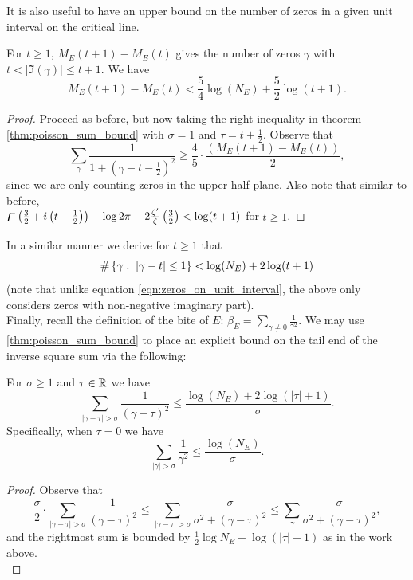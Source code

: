 It is also useful to have an upper bound on the number of zeros in a given unit interval on the critical line.
\begin{corollary}[GRH]\label{cor:zeros_on_unit_interval}
For $t\ge1$, $M_E(t+1)-M_E(t)$ gives the number of zeros $\gamma$ with $t < |\Im(\gamma)| \le t+1$. We have
\begin{equation}\label{eqn:zeros_on_unit_interval}
M_E(t+1)-M_E(t) < \frac{5}{4}\log(N_E) + \frac{5}{2}\log(t+1).
\end{equation}
\end{corollary}
\begin{proof}
Proceed as before, but now taking the right inequality in theorem \ref{thm:poisson_sum_bound} with $\sigma = 1$ and $\tau=t+\frac{1}{2}$. Observe that
\begin{equation*}
\sum_{\gamma}\frac{1}{1+\left(\gamma-t-\frac{1}{2}\right)^2} \ge \frac{4}{5}\cdot\frac{\left(M_E(t+1)-M_E(t)\right)}{2},
\end{equation*}
since we are only counting zeros in the upper half plane. Also note that similar to before,\\
$\digamma\left(\frac{3}{2}+i\left(t+\frac{1}{2}\right)\right) - \log 2\pi - 2\frac{\zeta^{\prime}}{\zeta}\left(\frac{3}{2}\right) < \log(t+1)$ for $t \ge 1$.
\end{proof}
In a similar manner we derive for $t \ge 1$ that
\begin{equation}\label{eqn:zeros_in_unit_ball}
\#\left\{\gamma:\;|\gamma-t|\le 1\right\} < \log(N_E) + 2\log(t+1)
\end{equation}
(note that unlike equation \ref{eqn:zeros_on_unit_interval}, the above only considers zeros with non-negative imaginary part). \\

Finally, recall the definition of the bite of $E$: $\beta_E = \sum_{\gamma \ne 0} \frac{1}{\gamma^2}$. We may use \ref{thm:poisson_sum_bound} to place an explicit bound on the tail end of the inverse square sum via the following:
\begin{corollary}[GRH]\label{cor:sum_tail_bound}
For $\sigma \ge 1$ and $\tau \in \mathbb{R}$ we have
\begin{equation}
\sum_{|\gamma-\tau|>\sigma} \frac{1}{(\gamma-\tau)^2} \le \frac{\log(N_E) + 2\log(|\tau|+1)}{\sigma}.
\end{equation}
Specifically, when $\tau=0$ we have
\begin{equation}
\sum_{|\gamma|>\sigma} \frac{1}{\gamma^2} \le \frac{\log(N_E)}{\sigma}.
\end{equation}
\end{corollary}
\begin{proof}
Observe that
\begin{equation*}
\frac{\sigma}{2}\cdot\sum_{|\gamma-\tau|>\sigma} \frac{1}{(\gamma-\tau)^2} \le \sum_{|\gamma-\tau|>\sigma} \frac{\sigma}{\sigma^2+(\gamma-\tau)^2} \le\sum_{\gamma} \frac{\sigma}{\sigma^2+(\gamma-\tau)^2},
\end{equation*}
and the rightmost sum is bounded by $\frac{1}{2}\log N_E + \log(|\tau|+1)$ as in the work above. \\
\end{proof}


